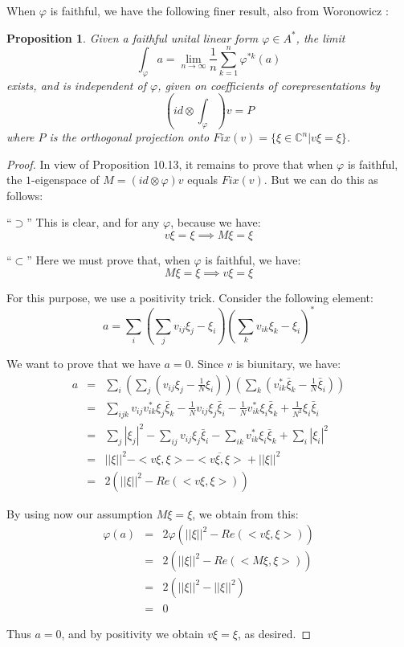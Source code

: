 \documentclass[12pt]{amsbook}
\newtheorem{proposition}[theorem]{Proposition}
\begin{document}
When $\varphi$ is faithful, we have the following finer result, also from Woronowicz \cite{wo1}:

\begin{proposition}
Given a faithful unital linear form $\varphi\in A^*$, the limit
$$\int_\varphi a=\lim_{n\to\infty}\frac{1}{n}\sum_{k=1}^n\varphi^{*k}(a)$$
exists, and is independent of $\varphi$, given on coefficients of corepresentations by
$$\left(id\otimes\int_\varphi\right)v=P$$
where $P$ is the orthogonal projection onto $Fix(v)=\{\xi\in\mathbb C^n|v\xi=\xi\}$.
\end{proposition}

\begin{proof}
In view of Proposition 10.13, it remains to prove that when $\varphi$ is faithful, the $1$-eigenspace of $M=(id\otimes\varphi)v$ equals $Fix(v)$. But we can do this as follows:

\medskip

``$\supset$'' This is clear, and for any $\varphi$, because we have:
$$v\xi=\xi\implies M\xi=\xi$$

``$\subset$'' Here we must prove that, when $\varphi$ is faithful, we have:
$$M\xi=\xi\implies v\xi=\xi$$

For this purpose, we use a positivity trick. Consider the following element:
$$a=\sum_i\left(\sum_jv_{ij}\xi_j-\xi_i\right)\left(\sum_kv_{ik}\xi_k-\xi_i\right)^*$$

We want to prove that we have $a=0$. Since $v$ is biunitary, we have:
\begin{eqnarray*}
a
&=&\sum_i\left(\sum_j\left(v_{ij}\xi_j-\frac{1}{N}\xi_i\right)\right)\left(\sum_k\left(v_{ik}^*\bar{\xi}_k-\frac{1}{N}\bar{\xi}_i\right)\right)\\
&=&\sum_{ijk}v_{ij}v_{ik}^*\xi_j\bar{\xi}_k-\frac{1}{N}v_{ij}\xi_j\bar{\xi}_i-\frac{1}{N}v_{ik}^*\xi_i\bar{\xi}_k+\frac{1}{N^2}\xi_i\bar{\xi}_i\\
&=&\sum_j|\xi_j|^2-\sum_{ij}v_{ij}\xi_j\bar{\xi}_i-\sum_{ik}v_{ik}^*\xi_i\bar{\xi}_k+\sum_i|\xi_i|^2\\
&=&||\xi||^2-<v\xi,\xi>-\overline{<v\xi,\xi>}+||\xi||^2\\
&=&2(||\xi||^2-Re(<v\xi,\xi>))
\end{eqnarray*}

By using now our assumption $M\xi=\xi$, we obtain from this:
\begin{eqnarray*}
\varphi(a)
&=&2\varphi(||\xi||^2-Re(<v\xi,\xi>))\\
&=&2(||\xi||^2-Re(<M\xi,\xi>))\\
&=&2(||\xi||^2-||\xi||^2)\\
&=&0
\end{eqnarray*}

Thus $a=0$, and by positivity we obtain $v\xi=\xi$, as desired.
\end{proof}
\end{document}
